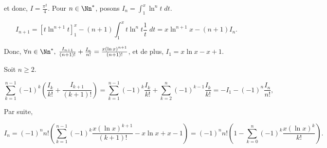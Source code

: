 {{et donc, $I=\frac{\pi^2}{4}$.
Pour $n\in\Nn^*$, posons $I_n=\int_{1}^{x}\ln^nt\;dt$.

$$I_{n+1}=\left[t\ln^{n+1}t\right]_{1}^{x}-(n+1)\int_{1}^{x}t\ln^nt\frac{1}{t}\;dt=x\ln^{n+1}x-(n+1)I_n.$$

Donc, $\forall n\in\Nn^*,\;\frac{I_{n+1}}{(n+1)!}+\frac{I_n}{n!}=\frac{x(\ln x)^{n+1}}{(n+1)!}$, et de plus, $I_1=x\ln x-x+1$.

Soit $n\geq2$.

$$\sum_{k=1}^{n-1}(-1)^k(\frac{I_k}{k!}+\frac{I_{k+1}}{(k+1)!})=\sum_{k=1}^{n-1}(-1)^k\frac{I_k}{k!}+\sum_{k=2}^{n}(-1)^{k-1}\frac{I_k}{k!}=-I_1-(-1)^n\frac{I_n}{n!},$$

Par suite,

$$I_n=(-1)^nn!(\sum_{k=1}^{n-1}(-1)^k\frac{x(\ln x)^{k+1}}{(k+1)!}-x\ln x+x-1)=(-1)^nn!(1-\sum_{k=0}^{n}(-1)^{k}\frac{x(\ln x)^{k}}{k!}).$$
}
}
